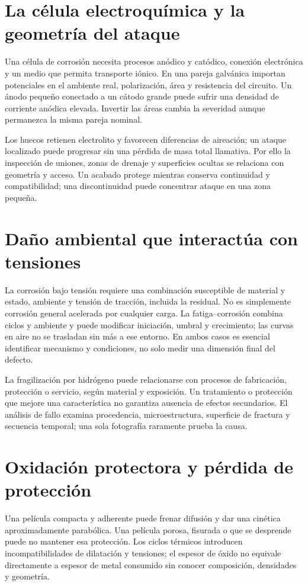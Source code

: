 
\section{La célula electroquímica y la geometría del ataque}
Una célula de corrosión necesita procesos anódico y catódico, conexión electrónica y un medio que permita transporte iónico. En una pareja galvánica importan potenciales en el ambiente real, polarización, área y resistencia del circuito. Un ánodo pequeño conectado a un cátodo grande puede sufrir una densidad de corriente anódica elevada. Invertir las áreas cambia la severidad aunque permanezca la misma pareja nominal.

Los huecos retienen electrolito y favorecen diferencias de aireación; un ataque localizado puede progresar sin una pérdida de masa total llamativa. Por ello la inspección de uniones, zonas de drenaje y superficies ocultas se relaciona con geometría y acceso. Un acabado protege mientras conserva continuidad y compatibilidad; una discontinuidad puede concentrar ataque en una zona pequeña.
\section{Daño ambiental que interactúa con tensiones}
La corrosión bajo tensión requiere una combinación susceptible de material y estado, ambiente y tensión de tracción, incluida la residual. No es simplemente corrosión general acelerada por cualquier carga. La fatiga--corrosión combina ciclos y ambiente y puede modificar iniciación, umbral y crecimiento; las curvas en aire no se trasladan sin más a ese entorno. En ambos casos es esencial identificar mecanismo y condiciones, no solo medir una dimensión final del defecto.

La fragilización por hidrógeno puede relacionarse con procesos de fabricación, protección o servicio, según material y exposición. Un tratamiento o protección que mejore una característica no garantiza ausencia de efectos secundarios. El análisis de fallo examina procedencia, microestructura, superficie de fractura y secuencia temporal; una sola fotografía raramente prueba la causa.
\section{Oxidación protectora y pérdida de protección}
Una película compacta y adherente puede frenar difusión y dar una cinética aproximadamente parabólica. Una película porosa, fisurada o que se desprende puede no mantener esa protección. Los ciclos térmicos introducen incompatibilidades de dilatación y tensiones; el espesor de óxido no equivale directamente a espesor de metal consumido sin conocer composición, densidades y geometría.


